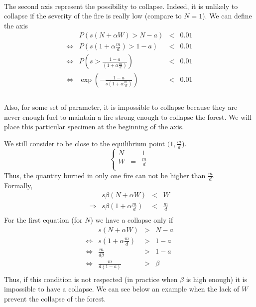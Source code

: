 \documentclass{article}
\begin{document}
\paragraph{}
The second axis represent the possibility to collapse. Indeed, it is unlikely to collapse if the severity of the fire is really low (compare to $N = 1$). We can define the axis 
\[
\begin{array}{rccl}
                &  P(s(N+\alpha W) > N-a ) & < & 0.01 \\
\Leftrightarrow &  P(s(1+\alpha \frac{m}{d}) > 1-a ) & < & 0.01 \\ 
\Leftrightarrow &  P(s > \frac{1-a}{(1+\alpha \frac{m}{d})} ) & < & 0.01 \\ 
\Leftrightarrow &  \exp(-\frac{1-a}{s(1+\alpha\frac{m}{d})}) & < & 0.01 \\ 
\end{array}
\]




\paragraph{}
Also, for some set of parameter, it is impossible to collapse because they are never enough fuel to maintain a fire strong enough to collapse the forest. We will place this particular specimen at the beginning of the axis.


We still consider to be close to the equilibrium point $(1, \frac{m}{d}$).
\[
\left\lbrace
\begin{array}{rcl}
     N & = & 1 \\
     W & = & \frac{m}{d} \\
\end{array}
\right.
\]
Thus, the quantity burned in only one fire can not be higher than $\frac{m}{d}$. \\
Formally,
\[
\begin{array}{crcl}
&s\beta(N+\alpha W) & < & W \\
\Rightarrow & s\beta(1+\alpha \frac{m}{d}) & < & \frac{m}{d} \\
\end{array}
\]
For the first equation (for $N$) we have a collapse only if
\[
\begin{array}{rccl}
                &  s(N+\alpha W) & > & N-a \\
\Leftrightarrow &  s(1+\alpha \frac{m}{d}) & > & 1-a \\ 
\Leftrightarrow &  \frac{m}{d\beta} & > & 1-a \\ 
\Leftrightarrow &  \frac{m}{d( 1-a)} & > & \beta \\ 
\end{array}
\]
Thus, if this condition is not respected (in practice when $\beta$ is high enough) it is impossible to have a collapse. We can see below  an example when the lack of $W$ prevent the collapse of the forest.
\end{document}

